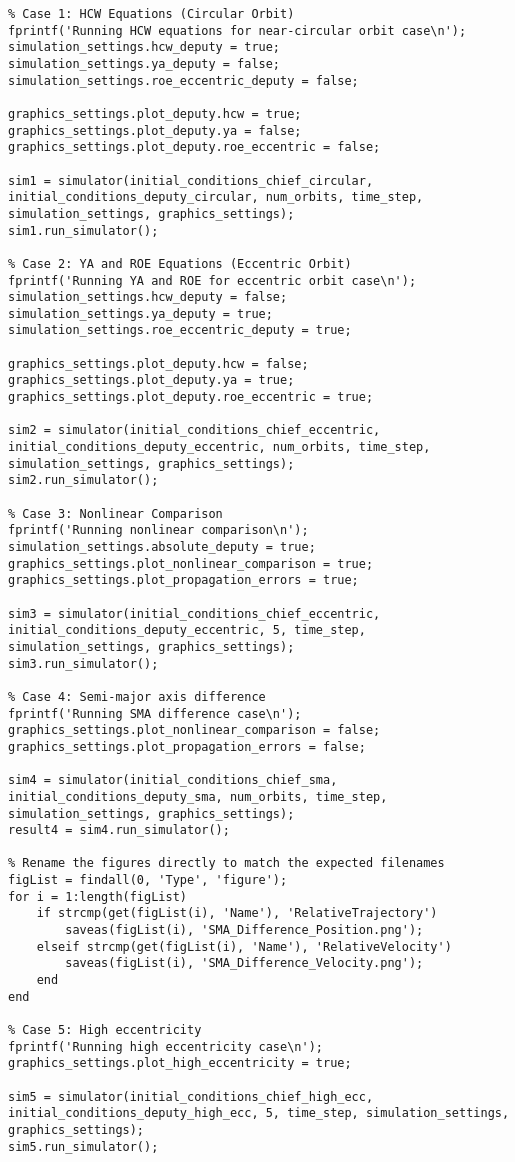 \begin{lstlisting}
% Case 1: HCW Equations (Circular Orbit)
fprintf('Running HCW equations for near-circular orbit case\n');
simulation_settings.hcw_deputy = true;
simulation_settings.ya_deputy = false;
simulation_settings.roe_eccentric_deputy = false;

graphics_settings.plot_deputy.hcw = true;
graphics_settings.plot_deputy.ya = false;
graphics_settings.plot_deputy.roe_eccentric = false;

sim1 = simulator(initial_conditions_chief_circular, initial_conditions_deputy_circular, num_orbits, time_step, simulation_settings, graphics_settings);
sim1.run_simulator();

% Case 2: YA and ROE Equations (Eccentric Orbit)
fprintf('Running YA and ROE for eccentric orbit case\n');
simulation_settings.hcw_deputy = false;
simulation_settings.ya_deputy = true;
simulation_settings.roe_eccentric_deputy = true;

graphics_settings.plot_deputy.hcw = false;
graphics_settings.plot_deputy.ya = true;
graphics_settings.plot_deputy.roe_eccentric = true;

sim2 = simulator(initial_conditions_chief_eccentric, initial_conditions_deputy_eccentric, num_orbits, time_step, simulation_settings, graphics_settings);
sim2.run_simulator();

% Case 3: Nonlinear Comparison
fprintf('Running nonlinear comparison\n');
simulation_settings.absolute_deputy = true;
graphics_settings.plot_nonlinear_comparison = true;
graphics_settings.plot_propagation_errors = true;

sim3 = simulator(initial_conditions_chief_eccentric, initial_conditions_deputy_eccentric, 5, time_step, simulation_settings, graphics_settings);
sim3.run_simulator();

% Case 4: Semi-major axis difference
fprintf('Running SMA difference case\n');
graphics_settings.plot_nonlinear_comparison = false;
graphics_settings.plot_propagation_errors = false;

sim4 = simulator(initial_conditions_chief_sma, initial_conditions_deputy_sma, num_orbits, time_step, simulation_settings, graphics_settings);
result4 = sim4.run_simulator();

% Rename the figures directly to match the expected filenames
figList = findall(0, 'Type', 'figure');
for i = 1:length(figList)
    if strcmp(get(figList(i), 'Name'), 'RelativeTrajectory')
        saveas(figList(i), 'SMA_Difference_Position.png');
    elseif strcmp(get(figList(i), 'Name'), 'RelativeVelocity')
        saveas(figList(i), 'SMA_Difference_Velocity.png');
    end
end

% Case 5: High eccentricity
fprintf('Running high eccentricity case\n');
graphics_settings.plot_high_eccentricity = true;

sim5 = simulator(initial_conditions_chief_high_ecc, initial_conditions_deputy_high_ecc, 5, time_step, simulation_settings, graphics_settings);
sim5.run_simulator();
\end{lstlisting}

